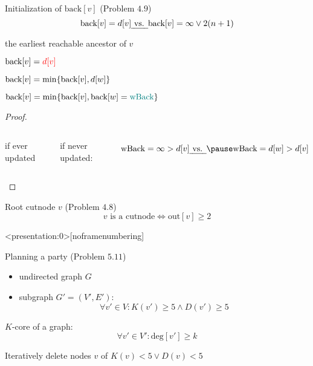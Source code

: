 \begin{frame}{}
  \begin{exampleblock}{Initialization of $\text{back}[v]$ (Problem $4.9$)}
    \[
      \text{back}[v] = d[v] \text{\emph{ vs. }} \text{back}[v] = \infty \lor 2(n+1) 
    \]
  \end{exampleblock}

  \pause
  \vspace{0.50cm}
  \centerline{ the earliest reachable ancestor of $v$} %

  \pause
  \vspace{0.30cm}
  \begin{description}
    \item[tree edge ($\to v$):]   $\text{back}[v] = \textcolor{red}{d[v]}$
    \item[back edge ($v \to w$):] $\text{back}[v] = \min \{\text{back}[v], d[w]\}$
    \item[backtracking from $w$:] $\text{back}[v] = \min \{\text{back}[v], \text{back}[w] = \textcolor{teal}{\text{wBack}}\}$
  \end{description}

  \pause
  \begin{proof}
    \begin{columns}
	\centerline{if ever updated}
	\pause
	\centerline{if never updated:}
	\pause
	\[
	  \text{wBack} = \infty > d[v] \text{\emph{ vs. }} \pause \text{wBack} = d[w] > d[v]
	\]
    \end{columns}
    \vspace{-0.50cm}
  \end{proof}
\end{frame}
\begin{frame}{}
  \begin{exampleblock}{Root cutnode $v$ (Problem $4.8$)}
    \[
      v \text{ is a cutnode} \iff \text{out}[v] \ge 2
    \]
  \end{exampleblock}

  \pause
\end{frame}
\begin{frame}<presentation:0>[noframenumbering]
  \begin{exampleblock}{Planning a party (Problem $5.11$)}
	\begin{itemize}
	  \item undirected graph $G$
	  \item subgraph $G' = (V', E')$:
		\[
		  \forall v' \in V: K(v') \ge 5 \land D(v') \ge 5
		\]
	\end{itemize}
  \end{exampleblock}

  \pause
  \vspace{0.50cm}
  $K$-core of a graph:
  \[
    \forall v' \in V': \text{deg}[v'] \ge k
  \]

  \pause
  \vspace{0.50cm}
  \centerline{Iteratively delete nodes $v$ of $K(v) < 5 \lor D(v) < 5$}
\end{frame}
